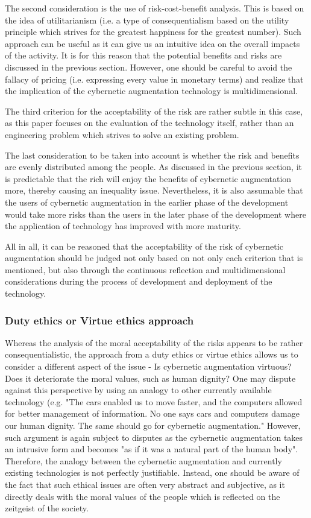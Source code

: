 The second consideration is the use of risk-cost-benefit analysis. This is based on the idea of utilitarianism (i.e. a type of consequentialism based on the utility principle which strives for the greatest happiness for the greatest number). Such approach can be useful as it can give us an intuitive idea on the overall impacts of the activity. It is for this reason that the potential benefits and risks are discussed in the previous section. However, one should be careful to avoid the fallacy of pricing (i.e. expressing every value in monetary terms) and realize that the implication of the cybernetic augmentation technology is multidimensional.

The third criterion for the acceptability of the risk are rather subtle in this case, as this paper focuses on the evaluation of the technology itself, rather than an engineering problem which strives to solve an existing problem. 

The last consideration to be taken into account is whether the risk and benefits are evenly distributed among the people. As discussed in the previous section, it is predictable that the rich will enjoy the benefits of cybernetic augmentation more, thereby causing an inequality issue. Nevertheless, it is also assumable that the users of cybernetic augmentation in the earlier phase of the development would take more risks than the users  in the later phase of the development where the application of technology has improved with more maturity.

All in all, it can be reasoned that the acceptability of the risk of cybernetic augmentation  should be judged not only based on not only each criterion that is mentioned, but also through the continuous reflection and multidimensional considerations during the process of development and deployment of the technology.

\subsubsection{Duty ethics or Virtue ethics approach}
Whereas the analysis of the moral acceptability of the risks appears to be rather consequentialistic, the approach from a duty ethics or virtue ethics allows us to consider a different aspect of the issue - Is cybernetic augmentation virtuous? Does it deteriorate the moral values, such as human dignity? One may dispute against this perspective by using an analogy to other currently available technology (e.g. "The cars enabled us to move faster, and the computers allowed for better management of information. No one says cars and computers damage our human dignity. The same should go for cybernetic augmentation." However, such argument is again subject to disputes as the cybernetic augmentation takes an intrusive form and becomes "as if it was a natural part of the human body". Therefore, the analogy between the cybernetic augmentation and currently existing technologies is not perfectly justifiable. Instead, one should be aware of the fact that such ethical issues are often very abstract and subjective, as it directly deals with the moral values of the people which is reflected on the zeitgeist of the society. 